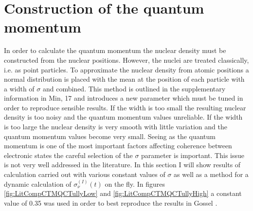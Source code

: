 \section{Construction of the quantum momentum}
\label{sect:SigmaSect}
In order to calculate the quantum momentum the nuclear density must be constructed from the nuclear positions. However, the nuclei are treated classically, i.e. as point particles. To approximate the nuclear density from atomic positions a normal distribution is placed with the mean at the position of each particle with a width of $\sigma$ and combined. This method is outlined in the supplementary information in Min, 17 \cite{min_ab_2017} and introduces a new parameter which must be tuned in order to reproduce sensible results. If the width is too small the resulting nuclear density is too noisy and the quantum momentum values unreliable. If the width is too large the nuclear density is very smooth with little variation and the quantum momentum values become very small. Seeing as the quantum momentum is one of the most important factors affecting coherence between electronic states the careful selection of the $\sigma$ parameter is important. This issue is not very well addressed in the literature. In this section I will show results of calculation carried out with various constant values of $\sigma$ as well as a method for a dynamic calculation of $\sigma^{(I)}_{\nu}(t)$ on the fly. In figures \ref{fig:LitCompCTMQCTullyLow} and \ref{fig:LitCompCTMQCTullyHigh} a constant value of 0.35 was used in order to best reproduce the results in Gossel \cite{gossel_coupled-trajectory_2018}.
